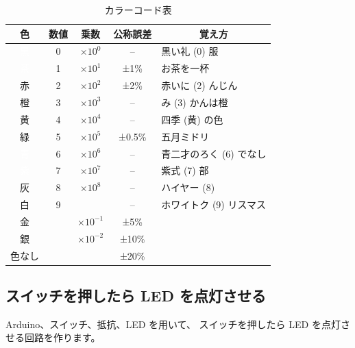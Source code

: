 \documentclass[11pt,a4paper]{jarticle}
\begin{document}
\begin{table}[htb]
 \begin{center}
  \caption{カラーコード表}
  \label{tb:colorCode}
  \begin{tabular}{|c|c|c|c|l|} \hline
   \hspace{1zw}色\hspace{1zw} & 数値 & 乗数 & 公称誤差 & \multicolumn{1}{c|}{覚え方} \\ \hline
   \cellcolor{black}\textcolor {white}{黒} & 0 & $×10^0$ & -- & 黒い礼 (0) 服 \\ \hline
   \cellcolor{Brown}\textcolor {white}茶 & 1 & $×10^1$ & ±1\% & お茶を一杯 \\ \hline
   \cellcolor{red}赤 & 2 & $×10^2$ & ±2\% & 赤いに (2) んじん \\ \hline
   \cellcolor[rgb]{1.0, 0.5, 0.0}橙 & 3 & $×10^3$ & -- & み (3) かんは橙 \\ \hline
   \cellcolor{yellow}黄 & 4 & $×10^4$ & -- & 四季 (黄) の色 \\ \hline
   \cellcolor{green}緑 & 5 & $×10^5$ & ±0.5\% & 五月ミドリ \\ \hline
   \cellcolor{blue}\textcolor {white}青 & 6 & $×10^6$ & -- & 青二才のろく (6) でなし \\ \hline
   \cellcolor[rgb]{0.5, 0.0, 0.5}\textcolor {white}紫 & 7 & $×10^7$ & -- & 紫式 (7) 部 \\ \hline
   \cellcolor[rgb]{0.5, 0.5, 0.5}灰 & 8 & $×10^8$ & -- & ハイヤー (8)  \\ \hline
   \cellcolor{white}白 & 9 &  & -- & ホワイトク (9) リスマス \\ \hline
   \cellcolor[rgb]{0.83, 0.69, 0.22}金 &  & $×10^{-1}$ & ±5\% & \\ \hline
   \cellcolor[rgb]{0.75, 0.75, 0.75}銀 &   & $×10^{-2}$ & ±10\% & \\ \hline
   \cellcolor[rgb]{0.96, 0.96, 0.86}色なし &   &   & ±20\% & \\ \hline
  \end{tabular}
 \end{center}
\end{table}

\subsection*{スイッチを押したら LED を点灯させる}
Arduino、スイッチ、抵抗、LED を用いて、
スイッチを押したら LED を点灯させる回路を作ります。
\end{document}
